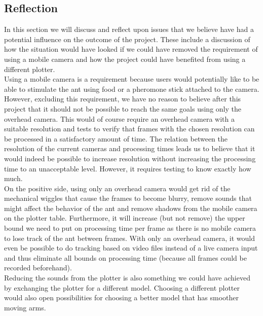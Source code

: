
\subsection{Reflection}
In this section we will discuss and reflect upon issues that we believe have had a potential influence on the outcome of the project. These include a discussion of how the situation would have looked if we could have removed the requirement of using a mobile camera and how the project could have benefited from using a different plotter. \\

Using a mobile camera is a requirement because users would potentially like to be able to stimulate the ant using food or a pheromone stick attached to the camera. However, excluding this requirement, we have no reason to believe after this project that it should not be possible to reach the same goals using only the overhead camera. This would of course require an overhead camera with a suitable resolution and tests to verify that frames with the chosen resolution can be processed in a satisfactory amount of time. The relation between the resolution of the current cameras and processing times leads us to believe that it would indeed be possible to increase resolution without increasing the processing time to an unacceptable level. However, it requires testing to know exactly how much. \\

On the positive side, using only an overhead camera would get rid of the mechanical wiggles that cause the frames to become blurry, remove sounds that might affect the behavior of the ant and remove shadows from the mobile camera on the plotter table. Furthermore, it will increase (but not remove) the upper bound we need to put on processing time per frame as there is no mobile camera to lose track of the ant between frames. With only an overhead camera, it would even be possible to do tracking based on   video files instead of a live camera input and thus eliminate all bounds on processing time (because all frames could be recorded beforehand). \\

Reducing the sounds from the plotter is also something we could have achieved by exchanging the plotter for a different model. Choosing a different plotter would also open possibilities for choosing a better model that has smoother moving arms.


